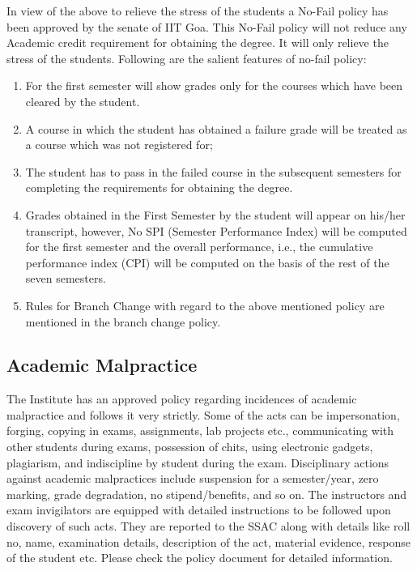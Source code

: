 In view of the above to relieve the stress of the students a No-Fail policy has been approved by the senate of IIT Goa. This No-Fail policy will not reduce any Academic credit requirement for obtaining the degree. It will only relieve the stress of the students. Following are the salient features of no-fail policy:

\begin{enumerate}[leftmargin=15mm, resume]
    \item For the first semester will show grades only for the courses which have been cleared by the student.
    \item A course in which the student has obtained a failure grade will be treated as a course which was not registered for;
    \item The student has to pass in the failed course in the subsequent semesters for completing the requirements for obtaining the degree.
    \item Grades obtained in the First Semester by the student will appear on his/her transcript, however, No SPI (Semester Performance Index) will be computed for the first semester and the overall performance, i.e., the cumulative performance index (CPI) will be computed on the basis of the rest of the seven semesters.
    \item Rules for Branch Change with regard to the above mentioned policy are mentioned in the branch change policy.
\end{enumerate}

\subsection{Academic Malpractice}

The Institute has an approved policy regarding incidences of academic malpractice and follows it very strictly. Some of the acts can be impersonation, forging, copying in exams, assignments, lab projects etc., communicating with other students during exams, possession of chits, using electronic gadgets, plagiarism, and indiscipline by student during the exam. Disciplinary actions against academic malpractices include suspension for a semester/year, zero marking, grade degradation, no stipend/benefits, and so on. The instructors and exam invigilators are equipped with detailed instructions to be followed upon discovery of such acts. They are reported to the SSAC along with details like roll no, name, examination details, description of the act, material evidence, response of the student etc. Please check the policy document for detailed information. 